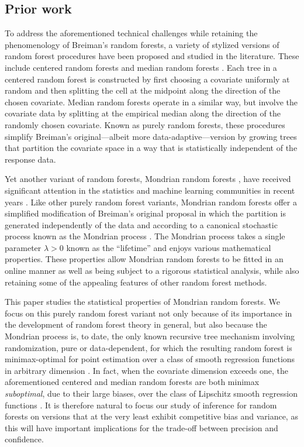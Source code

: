 \subsection{Prior work}

To address the aforementioned technical challenges while retaining the
phenomenology of Breiman's random forests, a variety of stylized
versions of random forest procedures have been proposed and
studied in the literature.
These include centered random forests
\citep{biau2012analysis, arnould2023interpolation}
and median random forests
\citep{duroux2016impact, arnould2023interpolation}.
Each tree in a centered random forest is constructed by first choosing a
covariate uniformly at random and then splitting the cell at the midpoint along
the direction of the chosen covariate. Median random forests operate in a
similar way, but involve the covariate data by splitting at the empirical
median along the direction of the randomly chosen covariate.
Known as purely random forests, these procedures simplify Breiman's
original---albeit more data-adaptive---version by growing trees that partition
the covariate space in a way that is statistically independent
of the response data.

Yet another variant of random forests, Mondrian random forests
\citep{lakshminarayanan2014mondrian},
have received significant attention in the statistics
and machine learning communities
in recent years
\citep{ma2020isolation, mourtada2020minimax, scillitoe2021uncertainty,
  mourtada2021amf, vicuna2021reducing, gao2022towards,
o2022stochastic}.
Like other purely random forest variants,
Mondrian random forests offer a simplified modification of
Breiman's original proposal
in which the partition is generated independently of the data
and according to a canonical stochastic process known as
the Mondrian process \citep{roy2008mondrian}.
The Mondrian process takes a single parameter $\lambda > 0$
known as the ``lifetime''
and enjoys various mathematical properties.
These properties allow Mondrian random forests to be
fitted in an online manner as well as being
subject to a rigorous statistical analysis,
while also retaining some of the appealing features
of other random forest methods.

This paper studies the statistical properties of Mondrian random forests.
We focus on this purely random forest variant not only because of its
importance in the development of random forest theory in general,
but also because the Mondrian process is, to date,
the only known recursive tree mechanism involving randomization,
pure or data-dependent, for which the resulting random forest is
minimax-optimal for point estimation over a class of smooth regression
functions in arbitrary dimension \citep{mourtada2020minimax}.
In fact, when the covariate dimension exceeds one,
the aforementioned centered and median random forests are both minimax
\emph{suboptimal}, due to their large biases, over the class of Lipschitz
smooth regression functions \citep{klusowski2021sharp}.
It is therefore natural to
focus our study of inference for random forests on versions that at the very
least exhibit competitive bias and variance, as this will have important
implications for the trade-off between precision and confidence.

